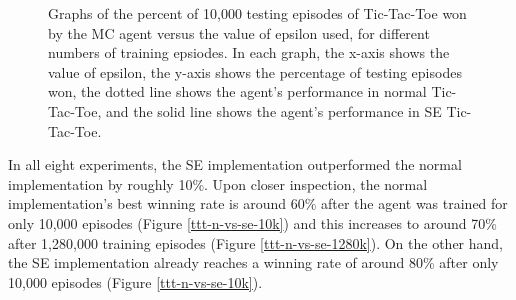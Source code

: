\documentclass[11pt,a4paper]{report}
\begin{document}
\begin{figure}

    \caption{Graphs of the percent of 10,000 testing episodes of Tic-Tac-Toe won by the MC agent versus the value of epsilon used, for different numbers of training epsiodes. In each graph, the x-axis shows the value of epsilon, the y-axis shows the percentage of testing episodes won, the dotted line shows the agent's performance in normal Tic-Tac-Toe, and the solid line shows the agent's performance in SE Tic-Tac-Toe.}
    \label{fig:tictactoe-normal-vs-symmetric-equality-epsilon}
\end{figure}

In all eight experiments, the SE implementation outperformed the normal implementation by roughly 10\%. Upon closer inspection, the normal implementation's best winning rate is around 60\% after the agent was trained for only 10,000 episodes (Figure \ref{ttt-n-vs-se-10k}) and this increases to around 70\% after 1,280,000 training episodes (Figure \ref{ttt-n-vs-se-1280k}). On the other hand, the SE implementation already reaches a winning rate of around 80\% after only 10,000 episodes (Figure \ref{ttt-n-vs-se-10k}).
\end{document}
